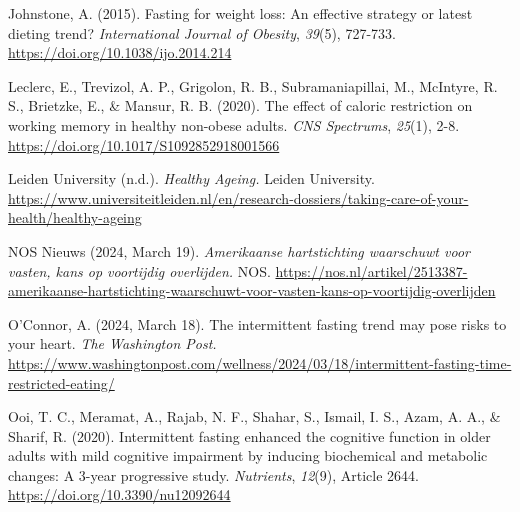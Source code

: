 \documentclass[authordate, empirical]{jote-new-article}
\begin{document}
Johnstone, A. (2015). Fasting for weight loss: An effective strategy or latest dieting trend? \emph{International Journal of Obesity}, \emph{39}(5), 727-733. \url{https://doi.org/10.1038/ijo.2014.214}







Leclerc, E., Trevizol, A. P., Grigolon, R. B., Subramaniapillai, M., McIntyre, R. S., Brietzke, E., \& Mansur, R. B. (2020). The effect of caloric restriction on working memory in healthy non-obese adults. \emph{CNS Spectrums}, \emph{25}(1), 2-8. \url{https://doi.org/10.1017/S1092852918001566}







Leiden University (n.d.). \emph{Healthy Ageing.} Leiden University. \url{https://www.universiteitleiden.nl/en/research-dossiers/taking-care-of-your-health/healthy-ageing}







NOS Nieuws (2024, March 19). \emph{Amerikaanse hartstichting waarschuwt voor vasten, kans op voortijdig overlijden.} NOS. \href{https://nos.nl/artikel/2513387-amerikaanse-hartstichting-waarschuwt-voor-vasten-kans-op-voortijdig-overlijden}{https://nos.nl/artikel/2513387-amerikaanse-hartstichting-waarschuwt-voor-vasten-kans-op-voortijdig-overlijden}







O'Connor, A. (2024, March 18). The intermittent fasting trend may pose risks to your heart. \emph{The Washington Post.} \url{https://www.washingtonpost.com/wellness/2024/03/18/intermittent-fasting-time-restricted-eating/}







Ooi, T. C., Meramat, A., Rajab, N. F., Shahar, S., Ismail, I. S., Azam, A. A., \& Sharif, R. (2020). Intermittent fasting enhanced the cognitive function in older adults with mild cognitive impairment by inducing biochemical and metabolic changes: A 3-year progressive study. \emph{Nutrients}, \emph{12}(9), Article 2644. \url{https://doi.org/10.3390/nu12092644}
\end{document}
